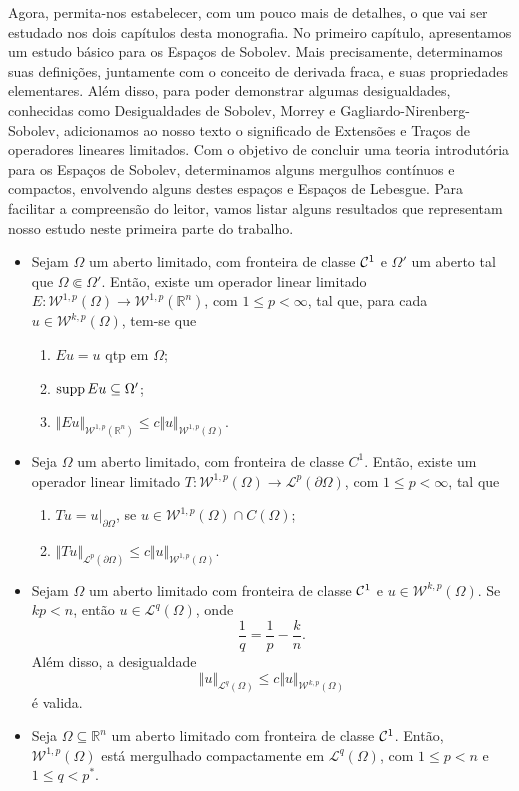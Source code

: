 Agora, permita-nos estabelecer, com um pouco mais de detalhes, o que vai ser estudado nos dois capítulos desta monografia. No primeiro capítulo, apresentamos um estudo básico para os Espaços de Sobolev. Mais precisamente, determinamos suas definições, juntamente com o conceito de derivada fraca, e suas propriedades elementares. Além disso, para poder demonstrar algumas desigualdades, conhecidas como Desigualdades de Sobolev, Morrey e Gagliardo-Nirenberg-Sobolev, adicionamos ao nosso texto o significado de Extensões e Traços de operadores lineares limitados. Com o objetivo de concluir uma teoria introdutória para os Espaços de Sobolev, determinamos alguns mergulhos contínuos e compactos, envolvendo alguns destes espaços e Espaços de Lebesgue. Para facilitar a compreensão do leitor, vamos listar alguns resultados que representam nosso estudo neste primeira parte do trabalho.
\begin{itemize}[label={\small$\bullet$}]
  \item Sejam $\Omega$ um aberto limitado, com fronteira de classe $\mathcal{C}^1$ e $\Omega'$ um aberto tal que $\Omega \Subset \Omega'$. Então, existe um operador linear limitado $E : \mathcal{W}^{1,p}(\Omega) \to \mathcal{W}^{1,p}(\mathbb{R} ^n)$, com $1 \leq p < \infty$, tal que, para cada $u \in \mathcal{W}^{k,p}(\Omega)$, tem-se que
    \begin{enumerate}
        \item $Eu = u$ qtp em $\Omega$;
        \item $\mathrm{supp}\, Eu \subseteq \Omega'$;
        \item $\Vert Eu \Vert_{\mathcal{W}^{1,p}(\mathbb{R}^n)} \leqslant c \Vert u \Vert_{\mathcal{W}^{1,p}(\Omega)}$.
    \end{enumerate}
  \item Seja $\Omega$ um aberto limitado, com fronteira de classe $C^1$. Então, existe um operador linear limitado $T : \mathcal{W}^{1,p}(\Omega) \to \mathcal{L}^p(\partial \Omega)$, com $1 \leq p < \infty$, tal que
    \begin{enumerate}
        \item $Tu = u \big|_{\partial \Omega}$, se $u \in \mathcal{W}^{1,p}(\Omega) \cap C(\Omega)$;
        \item $\Vert Tu \Vert_{\mathcal{L}^p(\partial\Omega)} \leq c \Vert u \Vert_{\mathcal{W}^{1,p}(\Omega)}$.
    \end{enumerate}
  \item Sejam $\Omega$ um aberto limitado com fronteira de classe $\mathcal{C}^1$ e $u \in \mathcal{W}^{k,p}(\Omega)$.
    Se $kp < n$, então $u \in \mathcal{L}^q(\Omega)$, onde
    \[
        \frac{1}{q} = \frac{1}{p} - \frac{k}{n}.
    \]
    Além disso, a desigualdade
    \[
        \Vert u \Vert_{\mathcal{L}^q(\Omega)} \leqslant c \Vert u \Vert_{\mathcal{W}^{k,p}(\Omega)}
    \]
    é valida.
  \item Seja $\Omega \subseteq \mathbb{R}^n$ um aberto limitado com fronteira de classe $\mathcal{C}^1$.
  Então, $\mathcal{W}^{1,p}(\Omega)$ está mergulhado compactamente em  $\mathcal{L}^q(\Omega)$,
        com $1 \leq p < n$ e $1 \leq q < p^*$.
\end{itemize}

